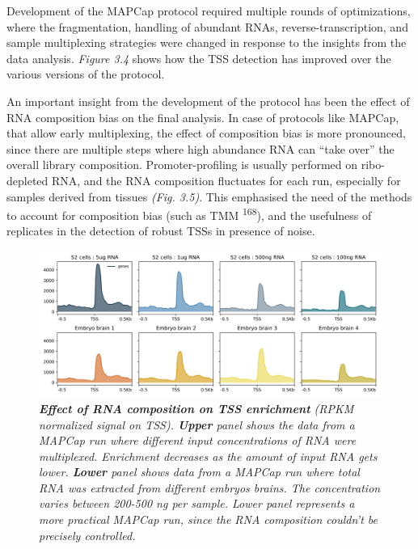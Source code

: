 \documentclass[11pt,twoside]{MPIthesis}
\theoremstyle{definition}
\theoremstyle{definition}
\theoremstyle{definition}
\theoremstyle{remark}
\begin{document}
Development of the MAPCap protocol required multiple rounds of
optimizations, where the fragmentation, handling of abundant RNAs,
reverse-transcription, and sample multiplexing strategies were changed
in response to the insights from the data analysis. \emph{Figure 3.4}
shows how the TSS detection has improved over the various versions of
the protocol.

An important insight from the development of the protocol has been the
effect of RNA composition bias on the final analysis. In case of
protocols like MAPCap, that allow early multiplexing, the effect of
composition bias is more pronounced, since there are multiple steps
where high abundance RNA can ``take over'' the overall library
composition. Promoter-profiling is usually performed on ribo-depleted
RNA, and the RNA composition fluctuates for each run, especially for
samples derived from tissues \emph{(Fig. 3.5)}. This emphasised the need
of the methods to account for composition bias (such as TMM
\textsuperscript{168}), and the usefulness of replicates in the
detection of robust TSSs in presence of noise.
\begin{figure}

{\centering \includegraphics[width=0.9\linewidth]{figures/results_fig5} 

}

\caption[Effect of RNA composition on TSS enrichment]{\emph{\textbf{Effect of RNA composition on TSS enrichment}
(RPKM normalized signal on TSS). \textbf{Upper} panel shows the data
from a MAPCap run where different input concentrations of RNA were
multiplexed. Enrichment decreases as the amount of input RNA gets lower.
\textbf{Lower} panel shows data from a MAPCap run where total RNA was
extracted from different embryos brains. The concentration varies
between 200-500 ng per sample. Lower panel represents a more practical
MAPCap run, since the RNA composition couldn't be precisely controlled.}}\label{fig:unnamed-chunk-10}
\end{figure}
\end{document}
